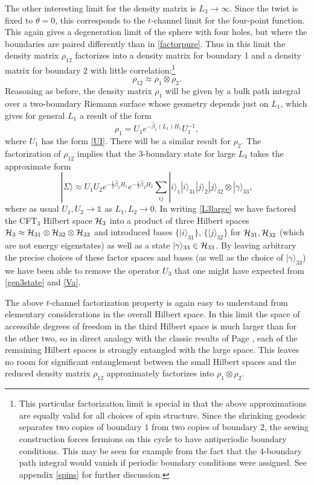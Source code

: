 \documentclass[12pt]{article}
\newcommand{\be}{\begin{equation}}
\newcommand{\ee}{\end{equation}}
\numberwithin{equation}{section}
\begin{document}
The other interesting limit for the density matrix is $L_3 \to \infty$.  Since the twist is fixed to $\theta =0$, this corresponds to the $t$-channel limit for the four-point function.   This again gives a degeneration limit of the sphere with four holes, but where the boundaries are paired differently than in \eqref{factorpure}. Thus in this limit the density matrix $\rho_{12}$ factorizes into a density matrix for boundary 1 and a density matrix for boundary 2 with little correlation:\footnote{This particular factorization limit is special in that the above approximations are equally valid for all choices of spin structure. Since the shrinking geodesic separates two copies of boundary $1$ from two copies of boundary $2$, the sewing construction forces fermions on this cycle to have antiperiodic boundary conditions.  This may be seen for example from the fact that the 4-boundary path integral would vanish if periodic boundary conditions were assigned.  See appendix \ref{spins} for further discussion.}
%
\be \label{rho12}
\rho_{12} \approx  \rho_1 \otimes \rho_2.
\ee
%
Reasoning as before, the density matrix $\rho_1$ will be given by a bulk path integral over a two-boundary Riemann surface whose geometry depends just on $L_1$, which gives for general $L_1$ a result of the form
\be
\label{rho1}
\rho_1 = U_1 e^{-\hat \beta_1 (L_1)H_1} U_1^{-1},
\ee
where $U_1$ has the form \eqref{UI}.   There will be a similar result for $\rho_2$.  The factorization of $\rho_{12}$ implies that the 3-boundary state for large $L_3$ takes the approximate form
\be
\label{L3large}
|\Sigma \rangle \approx U_1 U_2 e^{-\frac{1}{2} \hat \beta_1 H_1} e^{- \frac{1}{2}\hat \beta_2 H_2}  \sum_{ij} |i\rangle_1 |i\rangle_{31} |j\rangle_2 |j\rangle_{32} \otimes |\gamma \rangle_{33},
\ee
where as usual $U_1,U_2 \rightarrow \mathds{1}$ as $L_1,L_2 \rightarrow 0$.  In writing \eqref{L3large} we have factored the CFT${}_3$ Hilbert space ${\cal H}_3$ into a product of three Hilbert spaces ${\cal H}_3 \approx {\cal H}_{31} \otimes {\cal H}_{32} \otimes {\cal H}_{33}$ and introduced bases $\{|i\rangle_{31}\}$, $\{|j\rangle_{32}\}$ for ${\cal H}_{31}, {\cal H}_{32}$ (which are not energy eigenstates) as well as a state $|\gamma\rangle_{33} \in {\cal H}_{33}$. By leaving arbitrary the precise choices of these factor spaces and bases (as well as the choice of $|\gamma \rangle_{33}$) we have been able to remove the operator $U_3$ that one might have expected from \eqref{gen3state} and \eqref{Va}.

The above $t$-channel factorization property is again easy to understand from elementary considerations in the overall Hilbert space. In this limit the space of accessible degrees of freedom in the third Hilbert space is much larger than for the other two, so in direct analogy with the classic results of Page \cite{Page:1993df}, each of the remaining Hilbert spaces is strongly entangled with the large space.  This leaves no room for significant entanglement between the small Hilbert spaces and the reduced density matrix $\rho_{12}$ approximately factorizes into $\rho_1 \otimes \rho_2$.
\end{document}
